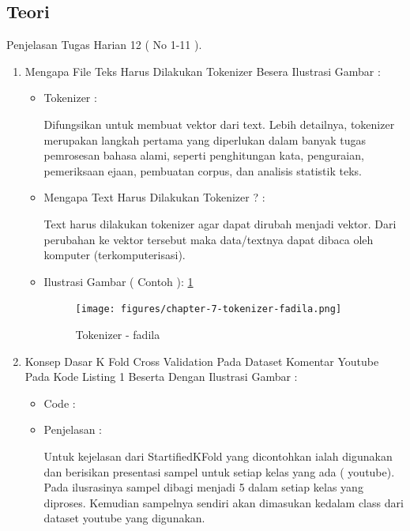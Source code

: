 \subsection{Teori}
Penjelasan Tugas Harian 12 ( No 1-11 ).
\begin{enumerate}
\item Mengapa File Teks Harus Dilakukan Tokenizer Besera Ilustrasi Gambar :
\begin{itemize}
\item Tokenizer :
\par Difungsikan untuk membuat vektor dari text. Lebih detailnya, tokenizer merupakan langkah pertama yang diperlukan dalam banyak tugas pemrosesan bahasa alami, seperti penghitungan kata, penguraian, pemeriksaan ejaan, pembuatan corpus, dan analisis statistik teks.
\par
\par
\item Mengapa Text Harus Dilakukan Tokenizer ? :
\par Text harus dilakukan tokenizer agar dapat dirubah menjadi vektor. Dari perubahan ke vektor tersebut maka data/textnya dapat dibaca oleh komputer (terkomputerisasi).
\par
\par
\item Ilustrasi Gambar ( Contoh ): \ref{chapter-7-tokenizer-fadila}
\par
\begin{figure}[!hbtp]
\centering
\texttt{[image: figures/chapter-7-tokenizer-fadila.png]}
\caption{Tokenizer - fadila}
\label{chapter-7-tokenizer-fadila}
\end{figure}
\par
\end{itemize}
\par
\par
\item Konsep Dasar K Fold Cross Validation Pada Dataset Komentar Youtube Pada Kode Listing 1 Beserta Dengan Ilustrasi Gambar :
\begin{itemize}
\item Code		:

\item Penjelasan	: 
\par Untuk kejelasan dari StartifiedKFold yang dicontohkan ialah digunakan dan berisikan presentasi sampel untuk setiap kelas yang ada ( youtube). Pada ilusrasinya sampel dibagi menjadi 5 dalam setiap kelas yang diproses. Kemudian sampelnya sendiri akan dimasukan kedalam class dari dataset youtube yang digunakan.

\end{itemize}
\end{enumerate}
